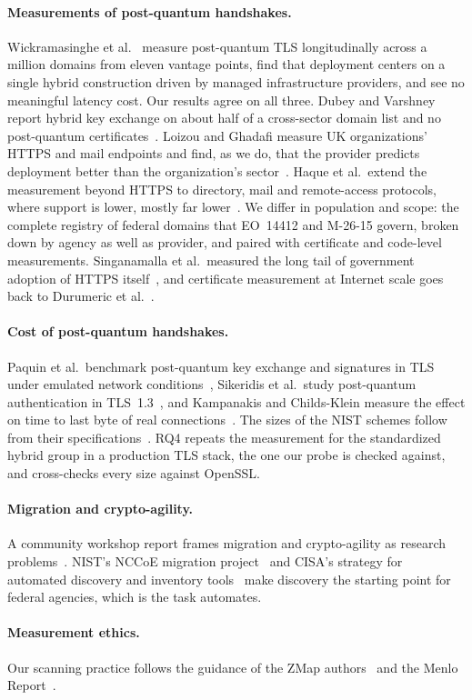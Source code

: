 \paragraph{Measurements of post-quantum handshakes.} Wickramasinghe et
al.~\cite{wickramasinghe2026} measure post-quantum TLS longitudinally across a
million domains from eleven vantage points, find that deployment centers on a
single hybrid construction driven by managed infrastructure providers, and see
no meaningful latency cost. Our results agree on all three. Dubey and
Varshney report hybrid key exchange on about half of a cross-sector domain list
and no post-quantum certificates~\cite{dubey2026}. Loizou and Ghadafi measure
UK organizations' HTTPS and mail endpoints and find, as we do, that the
provider predicts deployment better than the organization's
sector~\cite{loizou2026}. Haque et al.\ extend the measurement beyond HTTPS to
directory, mail and remote-access protocols, where support is lower,
mostly far lower~\cite{haque2026}. We differ in population and scope: the complete
registry of federal domains that EO~14412 and M-26-15 govern, broken down by
agency as well as provider, and paired with certificate and code-level
measurements. Singanamalla et al.\ measured the long tail of government adoption of
HTTPS itself~\cite{singanamalla2020}, and
certificate measurement at Internet scale goes back to
Durumeric et al.~\cite{durumeric2013https}.

\paragraph{Cost of post-quantum handshakes.} Paquin et al.\ benchmark post-quantum
key exchange and signatures in TLS under emulated network
conditions~\cite{paquin2020}, Sikeridis et al.\ study post-quantum
authentication in TLS~1.3~\cite{sikeridis2020}, and Kampanakis and
Childs-Klein measure the effect on time to last byte of real
connections~\cite{kampanakis2024}. The sizes of the NIST schemes follow from
their specifications~\cite{fips203,fips204,fips205}. RQ4 repeats the
measurement for the standardized hybrid group in a production TLS stack, the
one our probe is checked against, and cross-checks every size against OpenSSL.

\paragraph{Migration and crypto-agility.} A community workshop report frames
migration and crypto-agility as research problems~\cite{ott2019}. NIST's NCCoE migration project~\cite{nccoe} and CISA's
strategy for automated discovery and inventory tools~\cite{cisaacdi} make
discovery the starting point for federal agencies, which is the task \tool{}
automates.

\paragraph{Measurement ethics.} Our scanning practice follows the guidance
of the ZMap authors~\cite{zmap} and the Menlo Report~\cite{menlo}.
